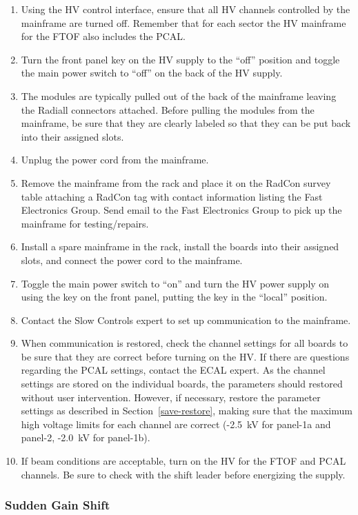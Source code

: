 \documentclass[12pt]{article}
\begin{document}
\begin{enumerate}
\item Using the HV control interface, ensure that all HV channels controlled by the
mainframe are turned off. Remember that for each sector the HV mainframe for the FTOF
also includes the PCAL.
\item Turn the front panel key on the HV supply to the ``off'' position and toggle the 
main power switch to ``off'' on the back of the HV supply.
\item The modules are typically pulled out of the back of the mainframe leaving the 
Radiall connectors attached. Before pulling the modules from the mainframe, be sure 
that they are clearly labeled so that they can be put back into their assigned slots.
\item Unplug the power cord from the mainframe.
\item Remove the mainframe from the rack and place it on the RadCon survey table
attaching a RadCon tag with contact information listing the Fast Electronics Group. 
Send email to the Fast Electronics Group to pick up the mainframe for testing/repairs.
\item Install a spare mainframe in the rack, install the boards into their assigned 
slots, and connect the power cord to the mainframe.
\item Toggle the main power switch to ``on'' and turn the HV power supply on using the 
key on the front panel, putting the key in the ``local'' position.
\item Contact the Slow Controls expert to set up communication to the mainframe.
\item When communication is restored, check the channel settings for all boards to be 
sure that they are correct before turning on the HV. If there are questions regarding 
the PCAL settings, contact the ECAL expert. As the channel settings are stored on the
individual boards, the parameters should restored without user intervention. However,
if necessary, restore the parameter settings as described in Section~\ref{save-restore},
making sure that the maximum high voltage limits for each channel are correct (-2.5~kV
for panel-1a and panel-2, -2.0~kV for panel-1b).
\item If beam conditions are acceptable, turn on the HV for the FTOF and PCAL channels. 
Be sure to check with the shift leader before energizing the supply.
\end{enumerate}

\subsubsection{Sudden Gain Shift}
\label{gain-shift}
\end{document}
